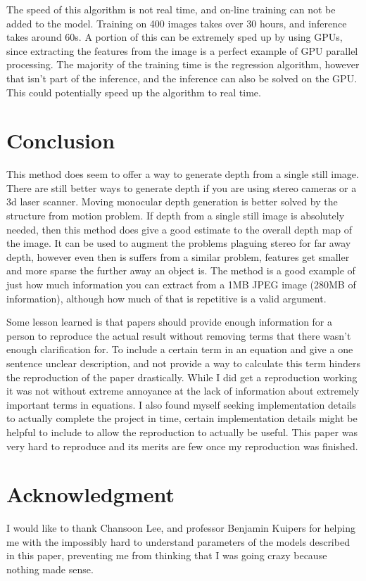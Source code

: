 \documentclass[journal]{IEEEtran}
\begin{document}
The speed of this algorithm is not real time, and on-line training can not be added to the model. Training on 400 images takes over 30 hours, and inference takes around 60s. A portion of this can be extremely sped up by using GPUs, since extracting the features from the image is a perfect example of GPU parallel processing. The majority of the training time is the regression algorithm, however that isn't part of the inference, and the inference can also be solved on the GPU. This could potentially speed up the algorithm to real time.

\section{Conclusion}
This method does seem to offer a way to generate depth from a single still image. There are still better ways to generate depth if you are using stereo cameras or a 3d laser scanner. Moving monocular depth generation is better solved by the structure from motion problem. If depth from a single still image is absolutely needed, then this method does give a good estimate to the overall depth map of the image. It can be used to augment the problems plaguing stereo for far away depth, however even then is suffers from a similar problem, features get smaller and more sparse the further away an object is. The method is a good example of just how much information you can extract from a 1MB JPEG image (280MB of information), although how much of that is repetitive is a valid argument.

Some lesson learned is that papers should provide enough information for a person to reproduce the actual result without removing terms that there wasn't enough clarification for. To include a certain term in an equation and give a one sentence unclear description, and not provide a way to calculate this term hinders the reproduction of the paper drastically. While I did get a reproduction working it was not without extreme annoyance at the lack of information about extremely important terms in equations. I also found myself seeking implementation details to actually complete the project in time, certain implementation details might be helpful to include to allow the reproduction to actually be useful. This paper was very hard to reproduce and its merits are few once my reproduction was finished.

\section*{Acknowledgment}
I would like to thank Chansoon Lee, and professor Benjamin Kuipers for helping me with the impossibly hard to understand parameters of the models described in this paper, preventing me from thinking that I was going crazy because nothing made sense.



\end{document}
